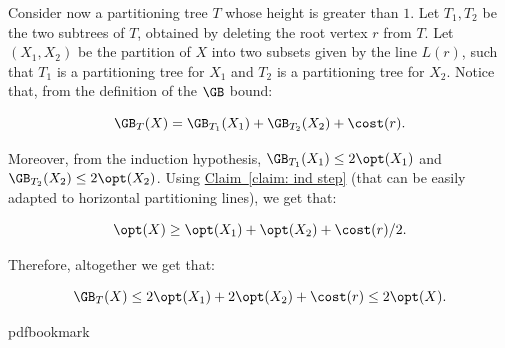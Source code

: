 \documentclass[11pt]{article}
\numberwithin{equation}{section}
\theoremstyle{definition}
\theoremstyle{plain}
\newcommand{\expref}[2]{\hyperref[#2]{#1~\ref{#2}}}
\begin{document}
Consider now a partitioning tree $T$ whose height is greater than $1$. Let $T_1,T_2$ be the two subtrees of $T$, obtained by deleting the root vertex $r$ from $T$. Let $(X_1,X_2)$ be the partition of $X$ into two subsets given by the line $L(r)$, such that $T_1$ is a partitioning tree for $X_1$ and $T_2$ is a partitioning tree for $X_2$. Notice that, from the definition of the $\GB$ bound:

\[\GB_T(X)=\GB_{T_1}(X_1)+\GB_{T_2}(X_2)+\cost(r).\]

Moreover, from the induction hypothesis, $\GB_{T_1}(X_1)\leq 2\opt(X_1)$ and $\GB_{T_2}(X_2)\leq 2\opt(X_2)$.
Using \expref{Claim}{claim: ind step} (that can be easily adapted to horizontal partitioning lines), we get that:


\[\opt(X)\geq \opt(X_1)+\opt(X_2)+\cost(r)/2.\]

Therefore, altogether we get that:


\[\GB_T(X)\leq 2\opt(X_1)+2\opt(X_2)+\cost(r)\leq 2\opt(X).  \]

\nocite{conf-version}


\newcommand{\prelim}{Preliminary version in\ }\newcommand{\prelims}{Preliminary
  versions in\ }
\providecommand{\bibhead}[1]{}
\expandafter\ifx\csname pdfbookmark\endcsname\relax%
  \providecommand{\tocrefpdfbookmark}{}
\else\providecommand{\tocrefpdfbookmark}{%
   \hypertarget{tocreferences}{}%
   \pdfbookmark[1]{References}{tocreferences}}%
\fi
\end{document}
